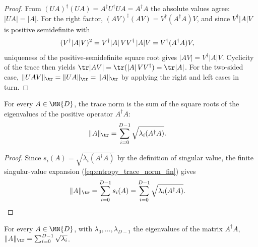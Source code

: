 \begin{proof}\leanok
    From $(UA)^\dagger(UA)=A^\dagger U^\dagger UA=A^\dagger A$ the absolute
    values agree: $\lvert UA\rvert=\lvert A\rvert$. For the right factor,
    $(AV)^\dagger(AV)=V^\dagger(A^\dagger A)V$, and since
    $V^\dagger\lvert A\rvert V$ is positive semidefinite with
    \begin{align}
        (V^\dagger\lvert A\rvert V)^2
         & =V^\dagger\lvert A\rvert\,VV^\dagger\,\lvert A\rvert V
        =V^\dagger(A^\dagger A)V,
        \notag
    \end{align}
    uniqueness of the positive-semidefinite square root gives
    $\lvert AV\rvert=V^\dagger\lvert A\rvert V$. Cyclicity of the trace then
    yields
    $\tr\lvert AV\rvert
        =\tr(\lvert A\rvert\,VV^\dagger)
        =\tr\lvert A\rvert$. For the two-sided case,
    $\lVert UAV\rVert_{\tr}
        =\lVert UA\rVert_{\tr}
        =\lVert A\rVert_{\tr}$
    by applying the right and left cases in turn.
\end{proof}

\begin{lemma}
    \label{lem:trace_norm_sqrt_eigenvalues}
    \leanok
    For every $A\in\MN{D}$, the trace norm is the sum of the square roots of
    the eigenvalues of the positive operator $A^\dagger A$:
    \begin{align}
        \lVert A\rVert_{\tr}
         & =\sum_{i=0}^{D-1}\sqrt{\lambda_i(A^\dagger A)}.
        \notag
    \end{align}
\end{lemma}

\begin{proof}\leanok
    Since $s_i(A)=\sqrt{\lambda_i(A^\dagger A)}$ by the definition of singular
    value, the finite singular-value expansion
    (\ref{eq:entropy_trace_norm_fin}) gives
    \begin{align}
        \lVert A\rVert_{\tr}
         & =\sum_{i=0}^{D-1}s_i(A)
        =\sum_{i=0}^{D-1}\sqrt{\lambda_i(A^\dagger A)}.
        \notag
    \end{align}
\end{proof}

\begin{lemma}
    \label{lem:trace_norm_sqrt_matrix_eigenvalues}
    \leanok
    For every $A\in\MN{D}$, with $\lambda_0,\ldots,\lambda_{D-1}$ the
    eigenvalues of the matrix $A^\dagger A$,
    $\lVert A\rVert_{\tr}
        =\sum_{i=0}^{D-1}\sqrt{\lambda_i}$.
\end{lemma}

